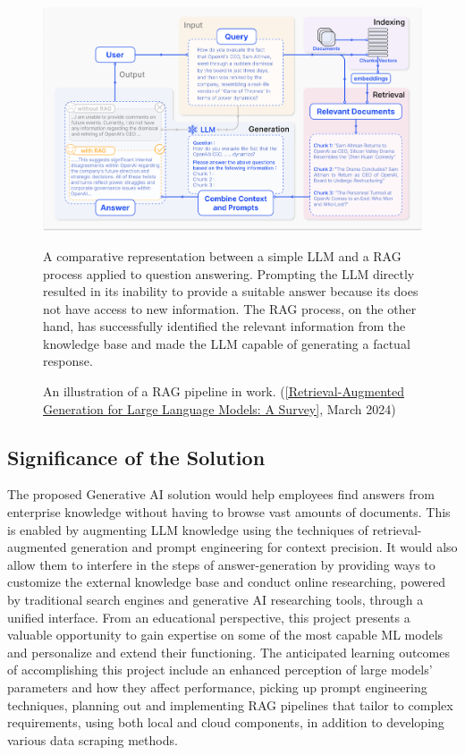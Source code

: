 \begin{figure}[H]
    \centering
    \includegraphics[width=\linewidth]{./figures/RAG_case.png}
    \caption{An illustration of a RAG pipeline in work. (\href{https://arxiv.org/html/2312.10997v5}{[Retrieval-Augmented Generation for Large Language Models: A Survey]}, March 2024)}
    \begin{flushleft}
        \small A comparative representation between a simple LLM and a RAG process applied to question answering. Prompting the LLM directly resulted in its inability to provide a suitable answer because its does not have access to new information. The RAG process, on the other hand, has successfully identified the relevant information from the knowledge base and made the LLM capable of generating a factual response.
    \end{flushleft}
\end{figure}
\subsection{Significance of the Solution}
The proposed Generative AI solution would help employees find answers from enterprise knowledge without having to browse vast amounts of documents. This is enabled by augmenting LLM knowledge using the techniques of retrieval-augmented generation and prompt engineering for context precision. It would also allow them to interfere in the steps of answer-generation by providing ways to customize the external knowledge base and conduct online researching, powered by traditional search engines and generative AI researching tools, through a unified interface.\medskip\newline
From an educational perspective, this project presents a valuable opportunity to gain expertise on some of the most capable ML models and personalize and extend their functioning. The anticipated learning outcomes of accomplishing this project include an enhanced perception of large models' parameters and how they affect performance, picking up prompt engineering techniques, planning out and implementing RAG pipelines that tailor to complex requirements, using both local and cloud components, in addition to developing various data scraping methods.

